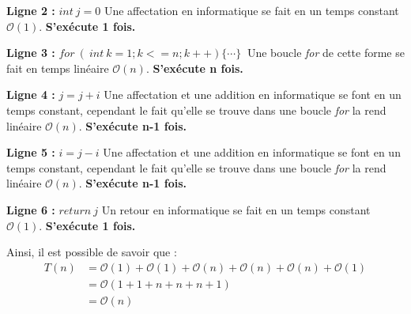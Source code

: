 \documentclass[12pt]{article}
\begin{document}
        \noindent \textbf{Ligne 2 :} \( int \: j = 0 \) \newline
        Une affectation en informatique se fait en un temps constant
        \( \mathcal{O}(1) \). \newline
		\textbf{S'exécute 1 fois.} \newline

        \noindent \textbf{Ligne 3 :}  \( for\: (\:int \: k=1;k<=n;k++) \{ \cdots \} \: \) \newline
        Une boucle \textit{for} de cette forme se fait en temps linéaire
        \( \mathcal{O}(n) \). \newline
        \textbf{S'exécute n fois.} \newline

        \noindent \textbf{Ligne 4 :} \( j=j+i \) \newline
        Une affectation et une addition en informatique se font en un temps constant, \newline
        cependant le fait qu'elle se trouve dans une boucle \textit{for} la rend linéaire
        \( \mathcal{O}(n) \). \newline
		\textbf{S'exécute n-1 fois.} \newline

        \noindent \textbf{Ligne 5 :} \( i = j-i \) \newline
  	    Une affectation et une addition en informatique se font en un temps constant, \newline
        cependant le fait qu'elle se trouve dans une boucle \textit{for} la rend linéaire
        \( \mathcal{O}(n) \). \newline
		\textbf{S'exécute n-1 fois.} \newline

        \noindent \textbf{Ligne 6 :} \( return \: j \) \newline
  	    Un retour en informatique se fait en un temps constant
        \( \mathcal{O}(1) \). \newline
        \textbf{S'exécute 1 fois.} \newline

        \noindent Ainsi, il est possible de savoir que :
	    \begin{align*}
	       T(n) &= \mathcal{O}(1)+\mathcal{O}(1)+\mathcal{O}(n)+\mathcal{O}(n)+\mathcal{O}(n)+\mathcal{O}(1) \\
	   	   &= \mathcal{O}(1+1+n+n+n+1) \\
	       &= \mathcal{O}(n)
	    \end{align*}
\end{document}

